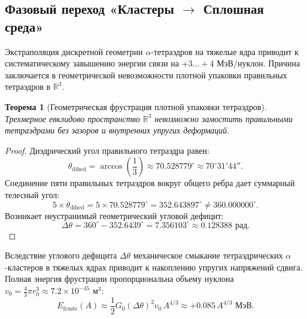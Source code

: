 \documentclass[11pt,a4paper]{article}
\newtheorem{theorem}{Теорема}
\theoremstyle{definition}
\theoremstyle{remark}
\begin{document}
\subsection{Фазовый переход «Кластеры $\to$ Сплошная среда»}

Экстраполяция дискретной геометрии $\alpha$-тетраэдров на тяжелые ядра приводит к систематическому завышению энергии связи на $+3\dots +4\text{ МэВ/нуклон}$. Причина заключается в геометрической невозможности плотной упаковки правильных тетраэдров в $\mathbb{R}^3$.

\begin{theorem}[Геометрическая фрустрация плотной упаковки тетраэдров]
	\label{thm:tetrahedral_frustration}
	Трехмерное евклидово пространство $\mathbb{R}^3$ невозможно замостить правильными тетраэдрами без зазоров и внутренних упругих деформаций.
\end{theorem}

\begin{proof}
	Диэдрический угол правильного тетраэдра равен:
\begin{equation}
\theta_{\mathrm{dihed}} = \arccos\left(\frac{1}{3}\right) \approx 70.528779^\circ \approx 70^\circ 31' 44''.
\end{equation}
Соединение пяти правильных тетраэдров вокруг общего ребра дает суммарный телесный угол:
\begin{equation}
	5 \times \theta_{\mathrm{dihed}} = 5 \times 70.528779^\circ = 352.643897^\circ \ne 360.000000^\circ.
\label{eq:five_tetrahedra_sum}
\end{equation}
Возникает неустранимый геометрический угловой дефицит:
\begin{equation}
	\Delta\theta = 360^\circ - 352.6439^\circ = 7.356103^\circ \approx 0.128388\text{ рад}.
\label{eq:angular_deficit_exact}
\end{equation}
\end{proof}

Вследствие углового дефицита $\Delta\theta$ механическое смыкание тетраэдрических $\alpha$-кластеров в тяжелых ядрах приводит к накоплению упругих напряжений сдвига. Полная энергия фрустрации пропорциональна объему нуклона $v_0 = \frac{4}{3}\pi r_0^3 \approx 7.2 \times 10^{-45}\text{ м}^3$:
\begin{equation}
    E_{\mathrm{frustr}}(A) \approx \frac{1}{2} G_0 (\Delta\theta)^2 v_0 \, A^{4/3} \approx +0.085 \, A^{4/3}\text{ МэВ}.
    \label{eq:frustration_energy_scaling}
\end{equation}
\end{document}
